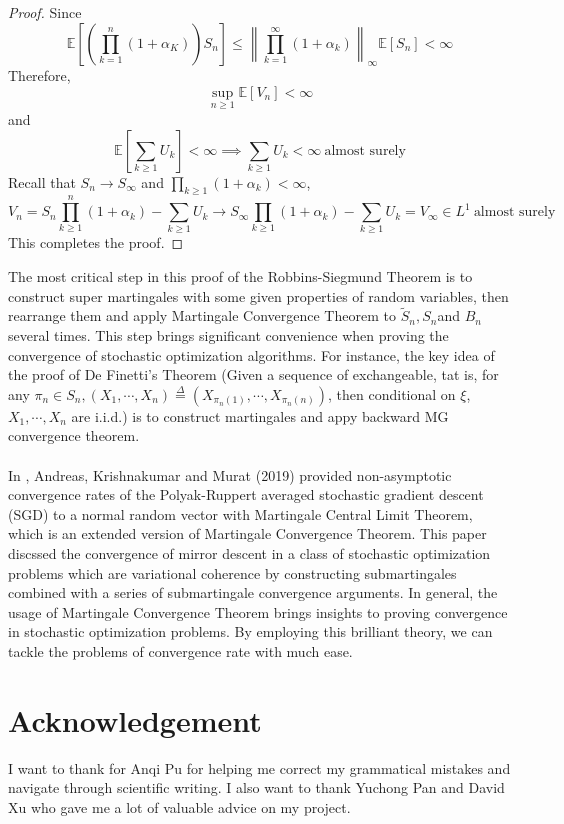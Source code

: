 \documentclass[10pt]{article}
\begin{document}
\begin{proof}
Since $$\mathbb{E}[\left(\prod_{k=1}^{n}(1+\alpha_K)\right)S_n]\le \left \lVert \prod_{k=1}^{\infty}(1+\alpha_k)\right \rVert_{\infty}\mathbb{E}[S_n]<\infty$$
Therefore, $$\sup_{n \ge 1}\mathbb{E}[V_n]<\infty$$ and $$\mathbb{E}[\sum_{k \ge 1}U_k]<\infty \implies \sum_{k \ge 1}U_k<\infty \ \text{almost surely}$$ Recall that $S_n \to S_{\infty}$ and $\prod_{k \ge 1}(1+\alpha_k)<\infty$, $$V_n=S_n\prod_{k\ge 1}^{n}(1+\alpha_k)-\sum_{k \ge 1}U_k \to S_{\infty}\prod_{k \ge 1}(1+\alpha_k)-\sum_{k \ge 1}U_k=V_{\infty} \in L^1\ \text{almost surely}$$
This completes the proof.
\end{proof}
The most critical step in this proof of the Robbins-Siegmund Theorem is to construct super martingales with some given properties of random variables, then rearrange them and apply Martingale Convergence Theorem to  $\tilde{S}_n, S_n $and $B_n $ several times. This step brings significant convenience when proving the convergence of stochastic optimization algorithms. For instance, the key idea of the proof of De Finetti’s Theorem\cite{David:2013} (Given a sequence of exchangeable, tat is, for any $\pi_n \in S_n, (X_1, \cdots, X_n)\overset{\Delta}{=}(X_{\pi_n(1)},\cdots, X_{\pi_n(n)})$, then conditional on $\xi$, $X_1, \cdots, X_n$  are i.i.d.) is to construct martingales and appy backward MG convergence theorem. \\\\
In \cite{pmlr-v99-anastasiou19a}, Andreas, Krishnakumar and Murat (2019) provided non-asymptotic convergence rates of the Polyak-Ruppert averaged stochastic gradient descent (SGD) to a normal random vector with Martingale Central Limit Theorem, which is an extended version of Martingale Convergence Theorem. This paper \cite{Zhengyuan:etal}discssed  the convergence of mirror descent in a class of stochastic optimization problems which are variational coherence by constructing submartingales combined with a series of submartingale convergence arguments. In general, the usage of Martingale Convergence Theorem brings insights to proving convergence in stochastic optimization problems.  By employing this brilliant theory, we can tackle the problems of convergence rate with much ease.





\section{Acknowledgement}
I want to thank for Anqi Pu for helping me correct my grammatical mistakes and navigate through scientific writing. I also want to thank Yuchong Pan and David Xu who gave me a lot of valuable advice on my project. 
\end{document}
